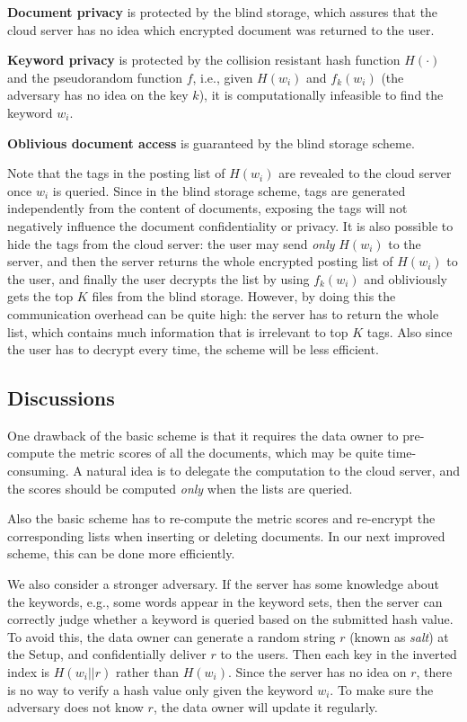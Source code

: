 \documentclass{IEEEtran}
\begin{document}
\textbf{Document privacy} is protected by the blind storage, which assures that the cloud server has no idea which encrypted document was returned to the user. 

\textbf{Keyword privacy} is protected by the collision resistant hash function $H(\cdot)$ and the pseudorandom function $f$, i.e., given $H(w_i)$ and $f_k(w_i)$ (the adversary has no idea on the key $k$), it is computationally infeasible to find the keyword $w_i$.

\textbf{Oblivious document access} is guaranteed by the blind storage scheme.

Note that the tags in the posting list of $H(w_i)$ are revealed to the cloud server once $w_i$ is queried. Since in the blind storage scheme, tags are generated independently from the content of documents, exposing the tags will not negatively influence the document confidentiality or privacy. It is also possible to hide the tags from the cloud server: the user may send \emph{only} $H(w_i)$ to the server, and then the server returns the whole encrypted posting list of $H(w_i)$ to the user, and finally the user decrypts the list by using $f_k(w_i)$ and obliviously gets the top $K$ files from the blind storage. However, by doing this the communication overhead can be quite high: the server has to return the whole list, which contains much information that is irrelevant to top $K$ tags. Also since the user has to decrypt every time, the scheme will be less efficient.

\subsection{Discussions}
One drawback of the basic scheme is that it requires the data owner to pre-compute the metric scores of all the documents, which may be quite time-consuming. A natural idea is to delegate the computation to the cloud server, and the scores should be computed \emph{only} when the lists are queried.

Also the basic scheme has to re-compute the metric scores and re-encrypt the corresponding lists when inserting or deleting documents. In our next improved scheme, this can be done more efficiently.

We also consider a stronger adversary. If the server has some knowledge about the keywords, e.g., some words appear in the keyword sets, then the server can correctly judge whether a keyword is queried based on the submitted hash value. To avoid this, the data owner can generate a random string $r$ (known as \emph{salt}) at the Setup, and confidentially deliver $r$ to the users. Then each key in the inverted index is $H(w_i||r)$ rather than $H(w_i)$. Since the server has no idea on $r$, there is no way to verify a hash value only given the keyword $w_i$. To make sure the adversary does not know $r$, the data owner will update it regularly.
\end{document}
